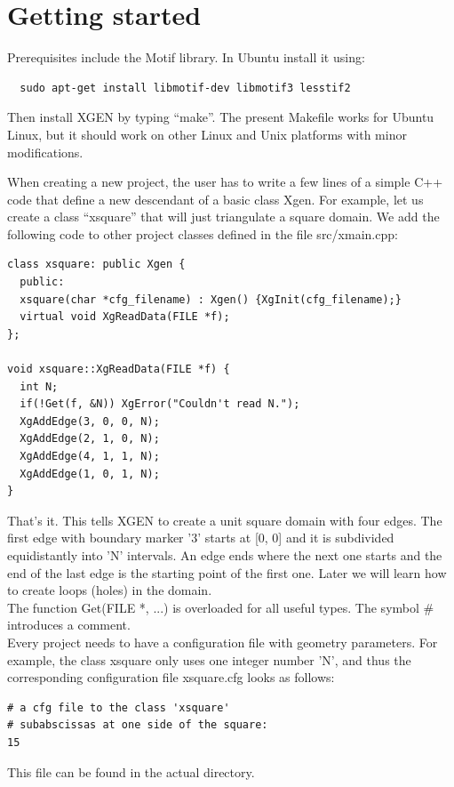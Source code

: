 \documentclass[12pt]{article}
\begin{document}
  \section{Getting started} \label{getting}
  
  Prerequisites include the Motif library. In Ubuntu install it using:

\begin{verbatim}
  sudo apt-get install libmotif-dev libmotif3 lesstif2
\end{verbatim}
  Then install XGEN by typing ``make''. The present Makefile works for
  Ubuntu Linux, but it should work on other Linux and Unix platforms with 
  minor modifications.
  
  When creating a new project, the user has to write 
  a few lines of a simple C++ code that define a new descendant of
  a basic class Xgen. For example, let us create a class ``xsquare''
  that will just triangulate a square domain. We add the following 
  code to other project classes defined in the file {src/xmain.cpp}:

  \footnotesize
  \begin{verbatim}
class xsquare: public Xgen {
  public:
  xsquare(char *cfg_filename) : Xgen() {XgInit(cfg_filename);}
  virtual void XgReadData(FILE *f);
};

void xsquare::XgReadData(FILE *f) {
  int N; 
  if(!Get(f, &N)) XgError("Couldn't read N.");
  XgAddEdge(3, 0, 0, N);
  XgAddEdge(2, 1, 0, N);
  XgAddEdge(4, 1, 1, N);
  XgAddEdge(1, 0, 1, N);
}
  \end{verbatim}
  That's it. This tells XGEN to create a unit square domain with four edges. The first 
  edge with boundary marker '3' starts at [0, 0] and it is subdivided 
  equidistantly into 'N' intervals. An edge ends where the next one  
  starts and the end of the last edge is the starting point of the first one.
  Later we will learn how to create loops (holes) in the domain.\\
  
  \noindent
  The function Get(FILE *, ...) is overloaded for all useful types. 
  The symbol \# introduces a comment.\\

  \noindent
  Every project needs to have a configuration file with 
  geometry parameters. For example, the class xsquare only 
  uses one integer number 'N', and thus the corresponding 
  configuration file xsquare.cfg looks as follows:
  \begin{verbatim}  
# a cfg file to the class 'xsquare'
# subabscissas at one side of the square:
15
  \end{verbatim}
  This file can be found in the actual directory. \\
\end{document}

